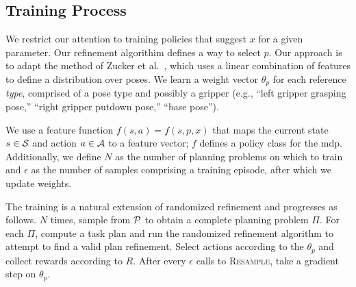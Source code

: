
\subsection{Training Process}
We restrict our attention to training policies that suggest $x$ for a
given parameter. Our refinement algorithim defines a way to select
$p$. Our approach is to adapt the method of Zucker et
al.~\cite{workspacebias}, which uses a linear combination of features
to define a distribution over poses. We learn a weight vector
$\theta_{p}$ for each reference \emph{type}, comprised of a pose type
and possibly a gripper (e.g., ``left gripper grasping pose,'' ``right
gripper putdown pose,'' ``base pose'').

We use a feature function $f(s, a) = f(s, p, x)$ that maps the current
state $s \in \mathcal{S}$ and action $a \in \mathcal{A}$ to a feature vector; $f$
defines a policy class for the {\sc mdp}. Additionally, we define $N$
as the number of planning problems on which to train and $\epsilon$ as
the number of samples comprising a training episode, after which we
update weights.

The training is a natural extension of randomized refinement and
progresses as follows. $N$ times, sample from $\mathcal{P}$ to obtain a
complete planning problem $\Pi$. For each $\Pi$, compute a task plan
and run the randomized refinement algorithm to attempt to find a valid
plan refinement. Select actions according to the $\theta_{p}$ and
collect rewards according to $R$. After every $\epsilon$ calls to
\textsc{Resample}, take a gradient step on $\theta_{p}$.

